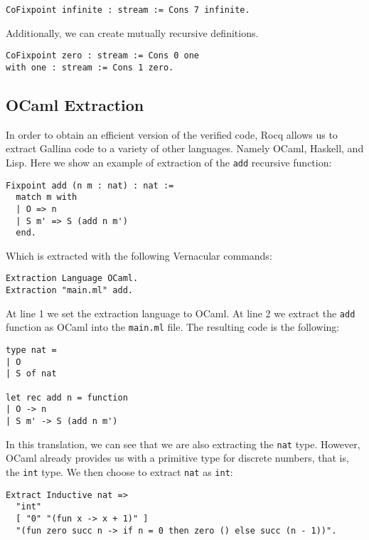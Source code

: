 \begin{lstlisting}[style=Rocq]
CoFixpoint infinite : stream := Cons 7 infinite.
\end{lstlisting}

Additionally, we can create mutually recursive definitions.

\begin{lstlisting}[style=Rocq]
CoFixpoint zero : stream := Cons 0 one
with one : stream := Cons 1 zero.
\end{lstlisting}

\subsection{OCaml Extraction}
\label{subsec:extract}

In order to obtain an efficient version of the verified code, Rocq allows us to extract Gallina code to a variety of other languages. Namely OCaml, Haskell, and Lisp. Here we show an example of extraction of the \texttt{add} recursive function:

\begin{lstlisting}[style=Rocq]
Fixpoint add (n m : nat) : nat :=
  match m with
  | O => n
  | S m' => S (add n m')
  end.
\end{lstlisting}

Which is extracted with the following Vernacular commands:

\begin{lstlisting}[style=Rocq]
Extraction Language OCaml.
Extraction "main.ml" add.
\end{lstlisting}

At line 1 we set the extraction language to OCaml. At line 2 we extract the \texttt{add} function as OCaml into the \texttt{main.ml} file. The resulting code is the following:

\begin{lstlisting}[style=OCaml]
type nat =
| O
| S of nat

let rec add n = function
| O -> n
| S m' -> S (add n m')
\end{lstlisting}

In this translation, we can see that we are also extracting the \texttt{nat} type. However, OCaml already provides us with a primitive type for discrete numbers, that is, the \texttt{int} type. We then choose to extract \texttt{nat} as \texttt{int}:

\begin{lstlisting}[style=OCaml]
Extract Inductive nat =>
  "int"
  [ "0" "(fun x -> x + 1)" ]
  "(fun zero succ n -> if n = 0 then zero () else succ (n - 1))".
\end{lstlisting}

